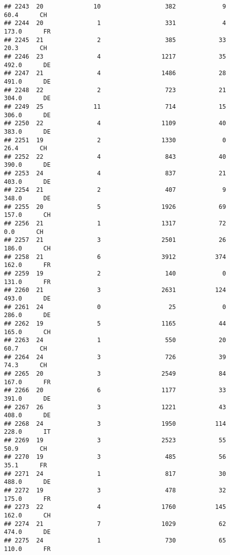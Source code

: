 \documentclass[
]{article}
\begin{document}
\begin{verbatim}
## 2243  20              10                  382             9     60.4      CH
## 2244  20               1                  331             4    173.0      FR
## 2245  21               2                  385            33     20.3      CH
## 2246  23               4                 1217            35    492.0      DE
## 2247  21               4                 1486            28    491.0      DE
## 2248  22               2                  723            21    304.0      DE
## 2249  25              11                  714            15    306.0      DE
## 2250  22               4                 1109            40    383.0      DE
## 2251  19               2                 1330             0     26.4      CH
## 2252  22               4                  843            40    390.0      DE
## 2253  24               4                  837            21    403.0      DE
## 2254  21               2                  407             9    348.0      DE
## 2255  20               5                 1926            69    157.0      CH
## 2256  21               1                 1317            72      0.0      CH
## 2257  21               3                 2501            26    186.0      CH
## 2258  21               6                 3912           374    162.0      FR
## 2259  19               2                  140             0    131.0      FR
## 2260  21               3                 2631           124    493.0      DE
## 2261  24               0                   25             0    286.0      DE
## 2262  19               5                 1165            44    165.0      CH
## 2263  24               1                  550            20     60.7      CH
## 2264  24               3                  726            39     74.3      CH
## 2265  20               3                 2549            84    167.0      FR
## 2266  20               6                 1177            33    391.0      DE
## 2267  26               3                 1221            43    408.0      DE
## 2268  24               3                 1950           114    228.0      IT
## 2269  19               3                 2523            55     50.9      CH
## 2270  19               3                  485            56     35.1      FR
## 2271  24               1                  817            30    488.0      DE
## 2272  19               3                  478            32    175.0      FR
## 2273  22               4                 1760           145    162.0      CH
## 2274  21               7                 1029            62    474.0      DE
## 2275  24               1                  730            65    110.0      FR

\end{verbatim}
\end{document}
